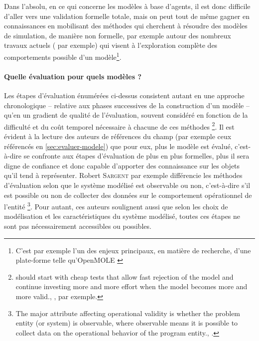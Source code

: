 Dans l'absolu, en ce qui concerne les modèles à base d'agents, il est donc difficile d'aller vers une validation formelle totale, mais on peut tout de même gagner en connaissances en mobilisant des méthodes qui cherchent à \og résoudre \fg{} des modèles de simulation, de manière non formelle, par exemple autour des nombreux travaux actuels (\cite{cherel_beyond_2015} par exemple) qui visent à l'exploration complète des comportements possible d'un modèle\footnote{C'est par exemple l'un des enjeux principaux, en matière de recherche, d'une plate-forme telle qu'OpenMOLE \autocite{reuillon_openmole_2013}}.

\paragraph{Quelle évaluation pour quels modèles ?}\label{par:quelle-eval-quel-modeles}

Les étapes d'évaluation énumérées ci-dessus consistent autant en une approche chronologique -- relative aux phases successives de la construction d'un modèle -- qu'en un gradient de qualité de l'évaluation, souvent considéré en fonction de la difficulté et du coût temporel nécessaire à chacune de ces méthodes
\footnote{
	\og [One] should start with cheap tests that allow fast rejection of the model and continue investing more and more effort when the model becomes more and more valid.\fg{}, \cite[42]{klugl_validation_2008}, par exemple.
}.
Il est évident à la lecture des auteurs de références du champ (par exemple ceux référencés en \cref{sec:evaluer-modele}) que pour eux, \og plus\fg{} le modèle est évalué, c'est-à-dire se confronte aux étapes d'évaluation de plus en plus formelles, plus il sera digne de confiance et donc capable d'apporter des connaissance sur les objets qu'il tend à représenter.
Robert \textsc{Sargent} par exemple différencie les méthodes d'évaluation selon que le système modélisé est observable ou non, c'est-à-dire \og s'il est possible ou non de collecter des données sur le comportement opérationnel de l'entité \fg{}
\footnote{
	\og The major attribute affecting operational validity is whether the problem entity (or system) is observable, where observable means it is possible to collect data on the operational behavior of the program entity.\fg{}, \cite[6]{sargent2009verification}.
}.
Pour autant, ces auteurs soulignent aussi que selon les choix de modélisation et les caractéristiques du système modélisé, toutes ces étapes ne sont pas nécessairement accessibles ou possibles.

